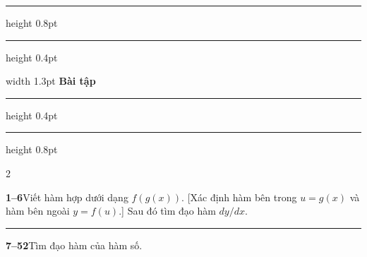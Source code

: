 \noindent
\begin{minipage}{\textwidth}
  {\color{stewartblue}\hrule height 0.8pt\vspace{1.5pt}\hrule height 0.4pt}
  \vspace{4pt}
  \noindent{}\quad 
  {\color{stewartblue!60}\vrule width 1.3pt}\quad 
  {\fontsize{17}{20}\selectfont\bfseries Bài tập}
  \vspace{4pt}
  {\color{stewartblue}\hrule height 0.4pt\vspace{1.5pt}\hrule height 0.8pt}
\end{minipage}
\vspace{8pt}

\setlength{\columnsep}{24pt}
\setlength{\parindent}{0pt}
\begin{multicols*}{2}

{\color{stewartblue}\bfseries 1--6}\enspace Viết hàm hợp dưới dạng $f(g(x))$. [Xác định hàm bên trong $u = g(x)$ và hàm bên ngoài $y = f(u)$.] Sau đó tìm đạo hàm $dy/dx$.\par\vspace{4pt}


\vspace{3pt}
{\color{stewartblue}\rule{\linewidth}{0.6pt}}\vspace{3pt}
{\color{stewartblue}\bfseries 7--52}\enspace Tìm đạo hàm của hàm số.\par\vspace{4pt}


\end{multicols*}
